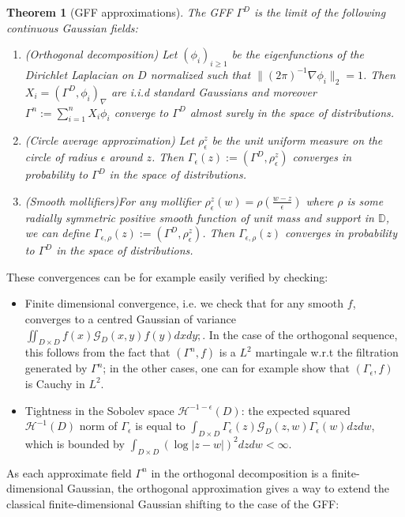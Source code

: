 \documentclass[11pt]{amsart}
\newtheorem{thm}{Theorem}[section]
\newcommand{\G}{\mathcal G}
\newcommand{\D}{\mathbb D}
\renewcommand{\1}{\mathbf 1}
\newcommand{\eps}{\epsilon}
\begin{document}
\begin{thm}[GFF approximations]\label{thm:GFFapp}
The GFF $\Gamma^D$ is the limit of the following continuous Gaussian fields:
\begin{enumerate}
\item (\textit{Orthogonal decomposition}) Let $(\phi_i)_{i\geq 1}$ be the eigenfunctions of the Dirichlet Laplacian on $D$ normalized such that $\| (2\pi)^{-1}\nabla \phi_i \|_2 = 1$. Then $X_i = (\Gamma^D, \phi_i)_\nabla$ are i.i.d standard Gaussians and moreover $\Gamma^n := \sum_{i=1}^n X_i \phi_i$ converge to $\Gamma^D$ almost surely in the space of distributions.
\item (\textit{Circle average approximation}) Let $\rho_\eps^z$ be the unit uniform measure on the circle of radius $\eps$ around $z$. Then $\Gamma_\eps(z) := (\Gamma^D, \rho_\eps^z)$ converges in probability to $\Gamma^D$ in the space of distributions.
\item (\textit{Smooth mollifiers})For any mollifier $\rho_\eps^z(w) = \rho(\frac{w - z}{\eps})$ where $\rho$ is some radially symmetric positive smooth function of unit mass and support in $\D$, we can define $\Gamma_{\eps,\rho}(z) := (\Gamma^D, \rho_\eps^z)$. Then $\Gamma_{\eps,\rho}(z)$ converges in probability to $\Gamma^D$ in the space of distributions.
\end{enumerate}
\end{thm}
These convergences can be for example easily verified by checking:
\begin{itemize}
\item Finite dimensional convergence, i.e. we check that for any smooth $f$,  converges to a centred Gaussian of variance $\iint_{D\times D} f(x) \G_D(x,y) f(y) d x d y;$. In the case of the orthogonal sequence, this follows from the fact that $(\Gamma^n,f)$ is a $L^2$ martingale w.r.t the filtration generated by $\Gamma^n$; in the other cases, one can for example show that $(\Gamma_\eps,f)$ is Cauchy in $L^2$.
\item Tightness in the Sobolev space $\mathcal{H}^{-1-\eps}(D)$: the expected squared $\mathcal{H}^{-1}(D)$ norm of $\Gamma_\eps$ is equal to $\int_{D \times D} \Gamma_\eps(z) \G_D(z,w) \Gamma_\eps(w)dzdw$, which is bounded by $\int_{D \times D}(\log |z-w|)^2dzdw < \infty$.
\end{itemize}
As each approximate field $\Gamma^n$ in the orthogonal decomposition is a finite-dimensional Gaussian, the orthogonal approximation gives a way to extend the classical finite-dimensional Gaussian shifting to the case of the GFF:
\end{document}
